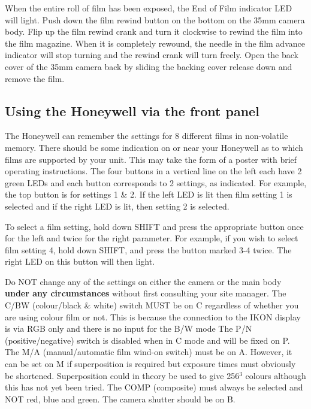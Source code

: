 When the entire roll of film has been exposed, the End of Film indicator LED
will light. Push down the film rewind button on the bottom on the 35mm
camera body. Flip up the film rewind crank and turn it clockwise to
rewind the film into the film magazine.  When it is completely rewound, 
the needle in the film advance indicator will stop turning and the rewind crank
will turn freely. Open the back cover of the 35mm camera back by sliding the
backing cover release down and remove the film.

\subsection{Using the Honeywell via the front panel}

The Honeywell can remember the settings for 8 different films in non-volatile
memory. There should be some indication on or near your Honeywell as to which
films are supported by your unit. This may take the form of a poster with brief
operating instructions. The four buttons in a vertical line on the left each
have 2 green LEDs and each button corresponds to 2 settings, as indicated. For
example, the top button is for settings 1 \& 2. If the left LED is lit then
film setting 1 is selected and if the right LED is lit, then setting 2 is
selected. 

To select a film setting, hold down SHIFT and press the appropriate
button once for the left and twice for the right parameter. For example, if you
wish to select film setting 4, hold down SHIFT, and press the button marked 3-4
twice. The right LED on this button will then light. 

Do NOT change any of the settings on either the camera or the main body {\bf under
any circumstances} without first consulting your site manager. The C/BW
(colour/black \& white) switch MUST be on C regardless of whether you
are using colour film or not. This is because the connection to the IKON
display is via RGB only and there is no input for the B/W mode
The P/N (positive/negative)
switch is disabled when in C mode and will be fixed on P.
The M/A (manual/automatic film wind-on switch) must be on A.
However, it can be set on M if superposition is required but exposure 
times must obviously be shortened. Superposition could in theory be used to give
256$^3$ colours although this has not yet been tried.
The COMP (composite) must always be selected and NOT red, blue and
green. The camera shutter should be on B.

